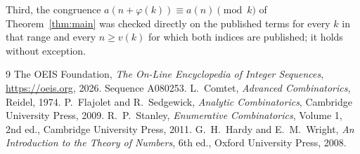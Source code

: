 \documentclass[11pt,a4paper]{article}
\theoremstyle{plain}
\theoremstyle{definition}
\begin{document}
Third, the congruence $a(n+\varphi(k))\equiv a(n)\pmod k$ of Theorem~\ref{thm:main} was
checked directly on the published terms for every $k$ in that range and every $n\ge v(k)$
for which both indices are published; it holds without exception.

\begin{thebibliography}{9}
 The OEIS Foundation, \emph{The On-Line Encyclopedia of Integer
Sequences}, \url{https://oeis.org}, 2026. Sequence A080253.
 L.~Comtet, \emph{Advanced Combinatorics}, Reidel, 1974.
 P.~Flajolet and R.~Sedgewick, \emph{Analytic Combinatorics}, Cambridge
University Press, 2009.
 R.~P.~Stanley, \emph{Enumerative Combinatorics}, Volume 1, 2nd ed.,
Cambridge University Press, 2011.
 G.~H.~Hardy and E.~M.~Wright, \emph{An Introduction to the Theory of
Numbers}, 6th ed., Oxford University Press, 2008.
\end{thebibliography}
\end{document}

